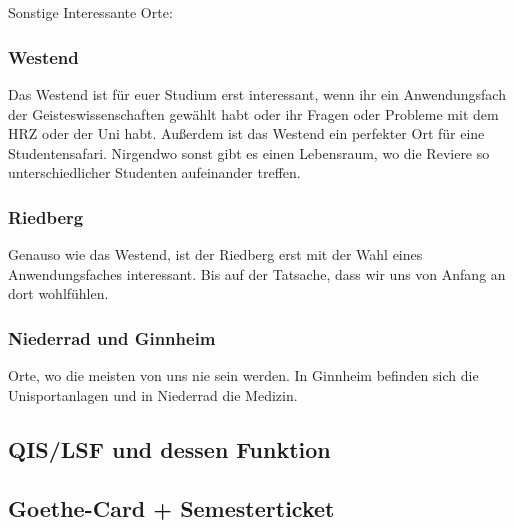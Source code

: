\documentclass[12pt,a4paper]{scrartcl}
\begin{document}
			\ \\\\ 
			Sonstige Interessante Orte:\\
		
		\subsubsection{Westend}
			Das Westend ist für euer Studium erst interessant, wenn ihr ein Anwendungsfach der Geisteswissenschaften gewählt habt oder ihr Fragen oder Probleme mit dem HRZ oder der Uni habt. Außerdem ist das Westend ein perfekter Ort für eine Studentensafari. Nirgendwo sonst gibt es einen Lebensraum, wo die Reviere so unterschiedlicher Studenten aufeinander treffen. \\
		
		\subsubsection{Riedberg}
			Genauso wie das Westend, ist der Riedberg erst mit der Wahl eines Anwendungsfaches interessant. Bis auf der Tatsache, dass wir uns von Anfang an dort wohlfühlen.
		\subsubsection{Niederrad und Ginnheim}
			Orte, wo die meisten von uns nie sein werden. In Ginnheim befinden sich die Unisportanlagen und in Niederrad die Medizin.
	
		
	\subsection{QIS/LSF und dessen Funktion}
	\newpage
		\subsection{Goethe-Card + Semesterticket}
		
		
\end{document}
